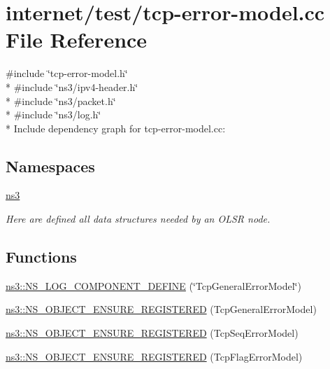 \hypertarget{tcp-error-model_8cc}{}\section{internet/test/tcp-\/error-\/model.cc File Reference}
\label{tcp-error-model_8cc}
{\ttfamily \#include \char`\"{}tcp-\/error-\/model.\+h\char`\"{}}\\*
{\ttfamily \#include \char`\"{}ns3/ipv4-\/header.\+h\char`\"{}}\\*
{\ttfamily \#include \char`\"{}ns3/packet.\+h\char`\"{}}\\*
{\ttfamily \#include \char`\"{}ns3/log.\+h\char`\"{}}\\*
Include dependency graph for tcp-\/error-\/model.cc\+:
\subsection*{Namespaces}
\begin{DoxyCompactItemize}
\item 
 \hyperlink{namespacens3}{ns3}
\begin{DoxyCompactList}\small\item\em Here are defined all data structures needed by an O\+L\+SR node. \end{DoxyCompactList}\end{DoxyCompactItemize}
\subsection*{Functions}
\begin{DoxyCompactItemize}
\item 
\hyperlink{namespacens3_aff99d1a7004a45f7ba9a74ee7ff0b538}{ns3\+::\+N\+S\+\_\+\+L\+O\+G\+\_\+\+C\+O\+M\+P\+O\+N\+E\+N\+T\+\_\+\+D\+E\+F\+I\+NE} (\char`\"{}Tcp\+General\+Error\+Model\char`\"{})
\item 
\hyperlink{namespacens3_af5021e929704e1de328e02c222c678b8}{ns3\+::\+N\+S\+\_\+\+O\+B\+J\+E\+C\+T\+\_\+\+E\+N\+S\+U\+R\+E\+\_\+\+R\+E\+G\+I\+S\+T\+E\+R\+ED} (Tcp\+General\+Error\+Model)
\item 
\hyperlink{namespacens3_a3a99cd19ff1571d047070afec9654066}{ns3\+::\+N\+S\+\_\+\+O\+B\+J\+E\+C\+T\+\_\+\+E\+N\+S\+U\+R\+E\+\_\+\+R\+E\+G\+I\+S\+T\+E\+R\+ED} (Tcp\+Seq\+Error\+Model)
\item 
\hyperlink{namespacens3_a911ec3af2c669a27fe8b88e89f67e658}{ns3\+::\+N\+S\+\_\+\+O\+B\+J\+E\+C\+T\+\_\+\+E\+N\+S\+U\+R\+E\+\_\+\+R\+E\+G\+I\+S\+T\+E\+R\+ED} (Tcp\+Flag\+Error\+Model)
\end{DoxyCompactItemize}
